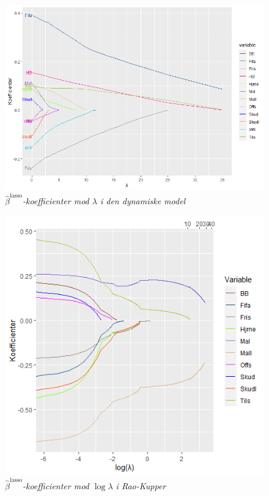 \documentclass[11pt,a4paper]{article}
\begin{document}
\begin{figure}[h!]
    \centering
    \includegraphics[width=\textwidth]{LINEPLOTDYNALPHA.png}
    \caption{\textit{$\hat{\beta}^{\text{lasso}}$-koefficienter mod $\lambda$ i den dynamiske model}}
    \label{fig:DBetaLasso}
\end{figure}
\begin{figure}[h!]
    \centering
    \includegraphics[width=\textwidth]{SKLMSA.png}
    \caption{\textit{$\hat{\beta}^{\text{lasso}}$-koefficienter mod $\log\lambda$ i Rao-Kupper}}
    \label{fig:SBetaLasso}
\end{figure}
\end{document}
